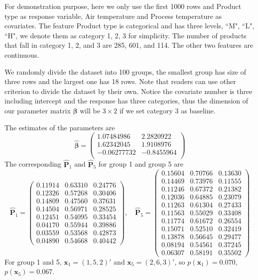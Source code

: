\documentclass[12pt]{article}
\newcommand{\betavec}{{\boldsymbol{\beta}}}
\newcommand{\Pmat}{\mathbf{P}}
\newcommand{\wh}{\widehat}
\newcommand{\xvec}{\boldsymbol{x}}
\begin{document}
For demonstration purpose, here we only use the first 1000 rows and Product type as response variable, Air temperature and Process temperature as covariates. The feature Product type is categorical and has three levels, ``M", ``L", ``H", we denote them as category 1, 2, 3 for simplicity. The number of products that fall in category 1, 2, and 3 are 285, 601, and 114. The other two features are continuous.


We randomly divide the dataset into 100 groups, the smallest group has size of three rows and the largest one has 18 rows. Note that readers can use other criterion to divide the dataset by their own. Notice the covariate number is three including intercept and the response has three categories, thus the dimension of our parameter matrix $\betavec$ will be $3 \times 2$ if we set category 3 as baseline.

The estimates of the parameters are
\begin{equation*}
\wh{\betavec} =
\begin{pmatrix}
 1.07484986 & 2.2820922 \\
 1.62342045 & 1.9108976 \\
 -0.06277732 &-0.8455964\\
\end{pmatrix}
\end{equation*}
The corresponding $\wh{\Pmat}_1$ and $\wh{\Pmat}_5$ for group 1 and group 5 are
\begin{equation*}
    \wh{\Pmat}_1 = \begin{pmatrix}

 0.11914 & 0.63310 & 0.24776\\
 0.12326 & 0.57268 & 0.30406\\
 0.14809 & 0.47560 & 0.37631\\
 0.14504 & 0.56971 & 0.28525\\
 0.12451 & 0.54095 & 0.33454\\
 0.04170 & 0.55944 & 0.39886\\
 0.03559 & 0.53568 & 0.42873\\
 0.04890 & 0.54668 & 0.40442
    \end{pmatrix}, \quad
    \wh{\Pmat}_5= \begin{pmatrix}
 0.15604 & 0.70766 & 0.13630\\
 0.14469 & 0.73976 & 0.11555\\
 0.11246 & 0.67372 & 0.21382\\
 0.12036 & 0.64885 & 0.23079\\
 0.11263 & 0.61304 & 0.27433\\
 0.11563 & 0.55029 & 0.33408\\
 0.11774 & 0.61672 & 0.26554\\
 0.15071 & 0.52510 & 0.32419\\
 0.13878 & 0.56645 & 0.29477\\
 0.08194 & 0.54561 & 0.37245\\
 0.06307 & 0.58191 & 0.35502
    \end{pmatrix}
\end{equation*}
For group 1 and 5, $\xvec_1 = (1,5,2)'$ and $\xvec_5 = (2,6,3)'$, so $p(\xvec_1) = 0.070$, $p(\xvec_5) = 0.067$.
\end{document}

